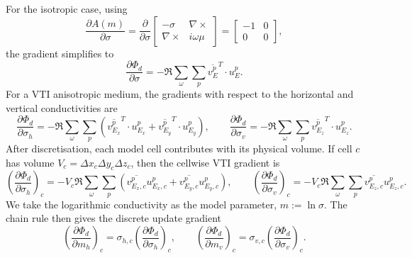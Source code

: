 \documentclass{article}
\begin{document}
For the isotropic case, using
\begin{equation}
  \frac{\partial A(m)}{\partial \sigma}=\frac{\partial }{\partial \sigma}\begin{bmatrix}
    -\sigma &\nabla\times \\
    \nabla\times & i\omega\mu
  \end{bmatrix}=\begin{bmatrix}
  -1 & 0\\
  0 & 0
  \end{bmatrix},
\end{equation}
the gradient simplifies to
\begin{equation}
\frac{\partial \Phi_d}{\partial \sigma} = -\Re \sum_\omega \sum_p \overline{v_E^p}^T \cdot u_E^p.
\end{equation}
For a VTI anisotropic medium, the gradients with respect to the horizontal and vertical conductivities are
\begin{equation}
  \frac{\partial \Phi_d}{\partial \sigma_h} = -\Re \sum_\omega \sum_p \left(\overline{v_{E_x}^p}^T\cdot u_{E_x}^p + \overline{v_{E_y}^p}^T\cdot u_{E_y}^p\right),
  \qquad
  \frac{\partial \Phi_d}{\partial \sigma_v} = -\Re \sum_\omega \sum_p \overline{v_{E_z}^p}^T\cdot u_{E_z}^p.
\end{equation}
After discretisation, each model cell contributes with its physical volume. If cell $c$ has volume $V_c=\Delta x_c\Delta y_c\Delta z_c$, then the cellwise VTI gradient is
\begin{equation}
  \left(\frac{\partial \Phi_d}{\partial \sigma_h}\right)_c
  = -V_c\Re \sum_\omega \sum_p
  \left(\overline{v_{E_x,c}^p}u_{E_x,c}^p+\overline{v_{E_y,c}^p}u_{E_y,c}^p\right),
  \qquad
  \left(\frac{\partial \Phi_d}{\partial \sigma_v}\right)_c
  = -V_c\Re \sum_\omega \sum_p \overline{v_{E_z,c}^p}u_{E_z,c}^p .
\end{equation}
We take the logarithmic conductivity as the model parameter, $m:=\ln \sigma$. The chain rule then gives the discrete update gradient
\begin{equation}
  \left(\frac{\partial \Phi_d}{\partial m_h}\right)_c
  =\sigma_{h,c}\left(\frac{\partial \Phi_d}{\partial \sigma_h}\right)_c,
  \qquad
  \left(\frac{\partial \Phi_d}{\partial m_v}\right)_c
  =\sigma_{v,c}\left(\frac{\partial \Phi_d}{\partial \sigma_v}\right)_c .
\end{equation}
\end{document}
